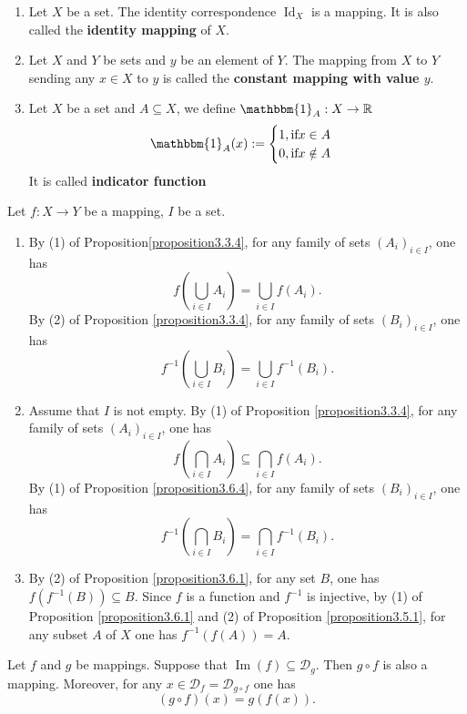 \documentclass{book}
\numberwithin{equation}{section}
\begin{document}
\begin{exampleenv}
    \quad
    \begin{enumerate}
    \item Let \( X \) be a set. The identity correspondence \( \operatorname{Id}_X \) is a mapping. It is also called the \textbf{identity mapping} of \( X \).
    \item Let \( X \) and \( Y \) be sets and \( y \) be an element of \( Y \). The mapping from \( X \) to \( Y \) sending any \( x \in X \) to \( y \) is called the \textbf{constant mapping with value \( y \)}.
    \item Let $X$ be a set and $A\subseteq X$, we define $\mathbbm{1}_A:X\rightarrow \mathbb{R}$   
    $$\mathbbm{1}_A(x):=\begin{cases}
 1, \text{if}\space x \in A \\0,\text{if}\space x \notin A

\end{cases}$$ 
It is called \textbf{indicator function}
\end{enumerate}
\end{exampleenv}


\begin{remark}
   Let \( f: X \to Y \) be a mapping, \( I \) be a set.
\begin{enumerate}
    \item By (1) of Proposition\ref{proposition3.3.4}, for any family of sets \( (A_i)_{i \in I} \), one has
    \[
    f\left(\bigcup_{i \in I} A_i\right) = \bigcup_{i \in I} f(A_i).
    \]
    By (2) of Proposition \ref{proposition3.3.4}, for any family of sets \( (B_i)_{i \in I} \), one has
    \[
    f^{-1}\left(\bigcup_{i \in I} B_i\right) = \bigcup_{i \in I} f^{-1}(B_i).
    \]
    \item Assume that \( I \) is not empty. By (1) of Proposition \ref{proposition3.3.4}, for any family of sets \( (A_i)_{i \in I} \), one has
    \[
    f\left(\bigcap_{i \in I} A_i\right) \subseteq \bigcap_{i \in I} f(A_i).
    \]
    By (1) of Proposition \ref{proposition3.6.4}, for any family of sets \( (B_i)_{i \in I} \), one has
    \[
    f^{-1}\left(\bigcap_{i \in I} B_i\right) = \bigcap_{i \in I} f^{-1}(B_i).
    \]
    \item By (2) of Proposition \ref{proposition3.6.1}, for any set \( B \), one has \( f(f^{-1}(B)) \subseteq B \). Since \( f \) is a function and \( f^{-1} \) is injective, by (1) of Proposition \ref{proposition3.6.1} and (2) of Proposition \ref{proposition3.5.1}, for any subset \( A \) of \( X \) one has \( f^{-1}(f(A)) = A \).
\end{enumerate}

 
\end{remark}
\begin{propositionenv}\label{proposition3.7.1}
    Let \( f \) and \( g \) be mappings. Suppose that \( \operatorname{Im}(f) \subseteq \mathscr{D}_g \). Then \( g \circ f \) is also a mapping. Moreover, for any \( x \in \mathscr{D}_f = \mathscr{D}_{g \circ f} \) one has
\[
(g \circ f)(x) = g(f(x)).
\]

\end{propositionenv}
\end{document}

